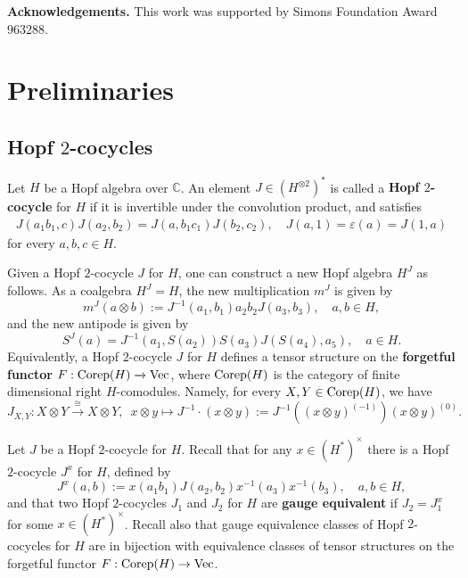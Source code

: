 \documentclass{amsart}
\theoremstyle{definition}
\newcommand{\Corep}{{\rm Corep}}
\newcommand{\Vect}{{\rm Vec}}
\newcommand{\ot}{\otimes}
\numberwithin{equation}{section}
\begin{document}
\noindent
{\bf Acknowledgements.} This work was supported by Simons Foundation Award 963288.

\section{Preliminaries}\label{sec:Preliminaries}

\subsection{Hopf $2$-cocycles}\label{sec:Hopf 2-cocycles} Let $H$ be a Hopf algebra over $\mathbb{C}$. An element  
$J\in (H^{\ot 2})^*$ is called a {\bf Hopf $2$-cocycle} for $H$ if it is invertible under the convolution product, and satisfies
\begin{align*}
J (a_1b_1,c)J (a_2,b_2)= J
(a,b_1c_1)J (b_2,c_2),\quad J (a,1) =\varepsilon(a)=J (1,a)
\end{align*}
for every $a,b,c\in H$.

Given a Hopf $2$-cocycle $J$ for $H$, one can construct a new Hopf algebra $H^{J}$ as follows. As a coalgebra $H^{J}=H$, the new multiplication $m^{J}$ is given by
\begin{equation*}
m^{J}(a\ot b):=J^{-1} (a_1,b_1)a_2b_2J
(a_3,b_3),\quad a,b\in H,
\end{equation*}
and the new antipode is given by
\begin{equation*}
S^{J}(a)=J ^{-1}(a_1,S(a_2))S(a_3)J
(S(a_4),a_5),\quad a\in H.
\end{equation*} 
Equivalently, a Hopf $2$-cocycle $J$ for $H$ defines a tensor structure on the {\bf forgetful functor} $F:\Corep(H)\xrightarrow{}\Vect$, where $\Corep(H)$ is the category of finite dimensional right $H$-comodules. Namely, for every $X,Y\in \Corep(H)$, we have
\begin{equation*}
J_{X,Y}:X\ot Y\xrightarrow{\cong} X\ot Y,\,\,\,x\ot y\mapsto J^{-1}\cdot (x\ot y):=J^{-1}((x\ot y)^{(-1)})(x\ot y)^{(0)}.
\end{equation*}

Let $J$ be a Hopf $2$-cocycle for $H$. Recall that for any $x\in (H^*)^{\times}$ there is a Hopf $2$-cocycle $J^x$ for $H$, defined by 
$$ J^{x} (a,b):=x(a_1b_1) J(a_2, b_2) x^{-1}(a_3)x^{-1}(b_3),\quad a,b \in H,$$
and that two Hopf $2$-cocycles $J_1$ and $J_2$ for $H$ are {\bf gauge equivalent} if $J_2=J_1^x$ for some $x\in (H^*)^{\times}$. Recall also that gauge equivalence classes of Hopf $2$-cocycles for $H$ are in bijection with equivalence classes of tensor structures on the forgetful functor $F:\Corep(H)\to\Vect$. 
\end{document}
